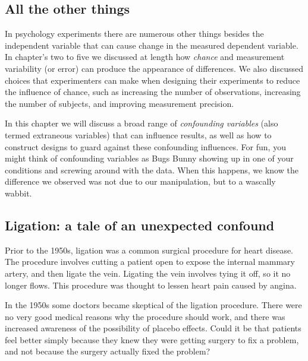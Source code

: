 \subsection{All the other things}

In psychology experiments there are numerous other things besides the independent variable that can cause change in the measured dependent variable. In chapter's two to five we discussed at length how \emph{chance} and measurement variability (or error) can produce the appearance of differences. We also discussed choices that experimenters can make when designing their experiments to reduce the influence of chance, such as increasing the number of observations, increasing the number of subjects, and improving measurement precision.

In this chapter we will discuss a broad range of \emph{confounding variables} (also termed extraneous variables) that can influence results, as well as how to construct designs to guard against these confounding influences. For fun, you might think of confounding variables as Bugs Bunny showing up in one of your conditions and screwing around with the data. When this happens, we know the difference we observed was not due to our manipulation, but to a wascally wabbit.

\subsection{Ligation: a tale of an unexpected confound}

Prior to the 1950s, ligation was a common surgical procedure for heart disease. The procedure involves cutting a patient open to expose the internal mammary artery, and then ligate the vein. Ligating the vein involves tying it off, so it no longer flows. This procedure was thought to lessen heart pain caused by angina.

In the 1950s some doctors became skeptical of the ligation procedure. There were no very good medical reasons why the procedure should work, and there was increased awareness of the possibility of placebo effects. Could it be that patients feel better simply because they knew they were getting surgery to fix a problem, and not because the surgery actually fixed the problem?

